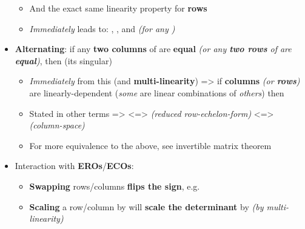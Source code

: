 \begin{itemize}
        \begin{itemize}

          \item
                And the exact same linearity property for \textbf{rows}
          \item
                \emph{Immediately} leads to: ,
                , and 
                \emph{(for any )}
        \end{itemize}
  \item
        \textbf{Alternating}: if any \textbf{two columns} of  are
        \textbf{equal} \emph{(or any \textbf{two rows} of  are
          \textbf{equal})}, then  (its singular)

        \begin{itemize}

          \item
                \emph{Immediately} from this (and \textbf{multi-linearity})
                => if \textbf{columns} \emph{(or \textbf{rows})} are
                linearly-dependent (\emph{some} are linear combinations of
                \emph{others}) then 
          \item
                Stated in other terms =>
                 \textless=>
                 \emph{(reduced
                  row-echelon-form)} \textless=>
                \emph{(column-space)}
          \item
                For more equivalence to the above, see invertible matrix theorem
        \end{itemize}
  \item
        Interaction with \textbf{EROs}/\textbf{ECOs}:

        \begin{itemize}

          \item
                \textbf{Swapping} rows/columns \textbf{flips the sign},
                e.g.~
          \item
                \textbf{Scaling} a row/column by  will
                \textbf{scale the determinant} by \iMbox{\lambda} \emph{(by
                  multi-linearity)}


\end{itemize}
\end{itemize}
